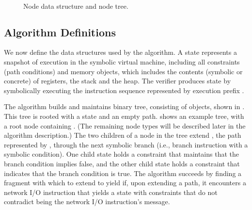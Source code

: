 \begin{figure}[t]
\centering
{}
\
\caption{Node data structure and node tree.
\label{fig:parallel:node}}
\end{figure}

\subsection{Algorithm Definitions}

We now define the data structures used by the algorithm. A 
state \symState{} represents a snapshot of execution in the symbolic
virtual machine, including all constraints (path conditions) and memory
objects, which includes the contents (symbolic or concrete) of
registers, the stack and the heap. The verifier produces state
\symState{\msgNmbr} by symbolically executing the instruction sequence
represented by execution prefix \execPrefix{\msgNmbr}.

The algorithm builds and maintains binary tree,
consisting of \Node objects, shown in .
This tree
is rooted with a state  and an empty path.
 shows an example tree, with a root
node containing \symState{\msgNmbr-1}. (The remaining
node types will be described later in the algorithm description.)
The two children of a node in the tree extend ,
the path represented by \symState{\msgNmbr-1}, 
 through the next symbolic branch (i.e., branch instruction with
 a symbolic condition). One child state holds a constraint
that maintains that the branch condition implies false, and the other
child state holds a constraint that indicates that the branch
condition is true. The algorithm succeeds by finding a fragment with
which to extend \execPrefix{\msgNmbr-1} to yield \execPrefix{\msgNmbr}
if, upon extending a path, it encounters a network I/O instruction
that yields a state with constraints that do not contradict
\msg{\msgNmbr} being the network I/O instruction's message.

